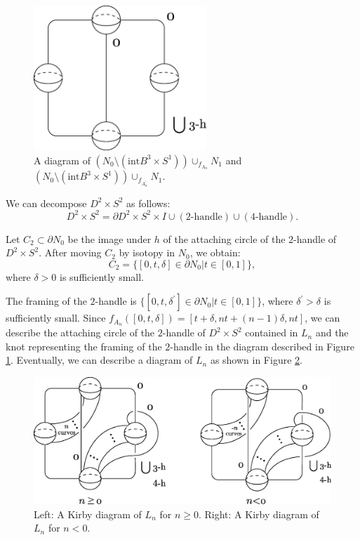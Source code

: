 \documentclass{amsart}
\theoremstyle{plain}
\theoremstyle{definition}
\begin{document}
\begin{figure}[htbp]
\begin{center}
\includegraphics[width=65mm]{N_0N_1.eps}
\end{center}
\caption{A diagram of $(N_0\setminus(\text{int}B^3\times S^1))\cup_{f_{A_n}}N_1$ and $(N_0\setminus(\text{int}B^3\times S^1))\cup_{f_{A_n^\prime}}N_1$. }
\label{N_0N_1}
\end{figure}

We can decompose $D^2\times S^2$ as follows: 
\[
D^2\times S^2=\partial D^2\times S^2\times I\cup(2\text{-handle})\cup(4\text{-handle}). 
\]

Let $C_2\subset\partial N_0$ be the image under $h$ of the attaching circle of the $2$-handle of $D^2\times S^2$. 
After moving $C_2$ by isotopy in $N_0$, we obtain: 
\[
C_2=\{[0,t,\delta]\in\partial N_0|t\in[0,1]\}, 
\]
where $\delta>0$ is sufficiently small. 


The framing of the $2$-handle is $\{[0,t,\delta^\prime]\in\partial N_0|t\in[0,1]\}$, where $\delta^\prime>\delta$ is sufficiently small. 
Since $f_{A_n}([0,t,\delta])=[t+\delta,nt+(n-1)\delta,nt]$, we can describe the attaching circle of the $2$-handle of $D^2\times S^2$ contained in $L_n$ and the knot representing the framing of the $2$-handle in the diagram described in Figure \ref{N_0N_1}. 
Eventually, we can describe a diagram of $L_n$ as shown in Figure \ref{L_n}. 

\begin{figure}[htbp]
\begin{center}
\includegraphics[width=135mm]{L_n.eps}
\end{center}
\caption{Left: A Kirby diagram of $L_n$ for $n\geq 0$. Right: A Kirby diagram of $L_n$ for $n<0$. }
\label{L_n}
\end{figure}
\end{document}
